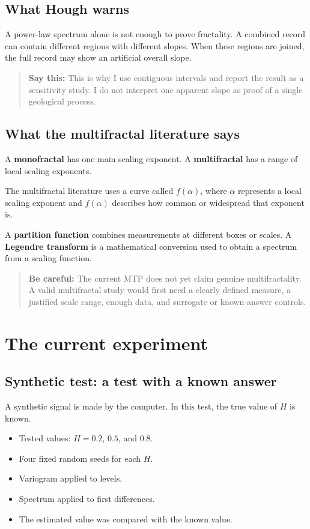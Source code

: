 \documentclass[11pt,a4paper]{article}
\newcommand{\term}[1]{\textbf{\color{Navy}#1}}
\newcommand{\say}[1]{\begin{quote}\color{Navy}\textbf{Say this:} #1\end{quote}}
\newcommand{\care}[1]{\begin{quote}\color{Amber}\textbf{Be careful:} #1\end{quote}}
\begin{document}
\subsection{What Hough warns}
A power-law spectrum alone is not enough to prove fractality. A combined record can contain different regions with different slopes. When these regions are joined, the full record may show an artificial overall slope.

\say{This is why I use contiguous intervals and report the result as a sensitivity study. I do not interpret one apparent slope as proof of a single geological process.}

\subsection{What the multifractal literature says}
A \term{monofractal} has one main scaling exponent. A \term{multifractal} has a range of local scaling exponents.

The multifractal literature uses a curve called $f(\alpha)$, where $\alpha$ represents a local scaling exponent and $f(\alpha)$ describes how common or widespread that exponent is.

A \term{partition function} combines measurements at different boxes or scales. A \term{Legendre transform} is a mathematical conversion used to obtain a spectrum from a scaling function.

\care{The current MTP does not yet claim genuine multifractality. A valid multifractal study would first need a clearly defined measure, a justified scale range, enough data, and surrogate or known-answer controls.}

\section{The current experiment}
\subsection{Synthetic test: a test with a known answer}
A synthetic signal is made by the computer. In this test, the true value of $H$ is known.

\begin{itemize}
\item Tested values: $H=0.2$, $0.5$, and $0.8$.
\item Four fixed random seeds for each $H$.
\item Variogram applied to levels.
\item Spectrum applied to first differences.
\item The estimated value was compared with the known value.
\end{itemize}
\end{document}
